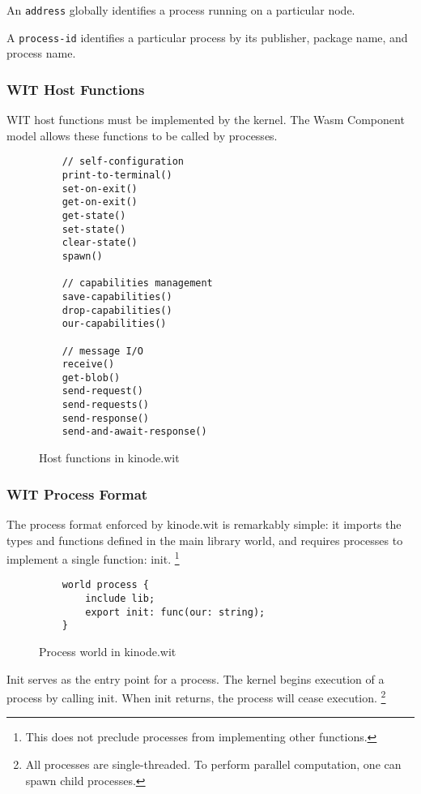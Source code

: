 \documentclass[runningheads]{llncs}
\begin{document}
An \verb|address| globally identifies a process running on a particular node.

A \verb|process-id| identifies a particular process by its publisher, package name, and process name.

\subsubsection{WIT Host Functions}

WIT host functions must be implemented by the kernel.
The Wasm Component model allows these functions to be called by processes.

\begin{figure}[H]
    \centering
    \begin{lstlisting}
    // self-configuration
    print-to-terminal()
    set-on-exit()
    get-on-exit()
    get-state()
    set-state()
    clear-state()
    spawn()

    // capabilities management
    save-capabilities()
    drop-capabilities()
    our-capabilities()

    // message I/O
    receive()
    get-blob()
    send-request()
    send-requests()
    send-response()
    send-and-await-response()
    \end{lstlisting}
    \caption{Host functions in kinode.wit}
    \label{fig:WIT Functions}
\end{figure}

\subsubsection{WIT Process Format}

The process format enforced by kinode.wit is remarkably simple: it imports the types and functions defined in the main library world, and requires processes to implement a single function: init.
\footnote{This does not preclude processes from implementing other functions.}

\begin{figure}[H]
    \centering
    \begin{lstlisting}
    world process {
        include lib;
        export init: func(our: string);
    }
    \end{lstlisting}
    \caption{Process world in kinode.wit}
    \label{fig:Process world}
\end{figure}

Init serves as the entry point for a process.
The kernel begins execution of a process by calling init.
When init returns, the process will cease execution.
\footnote{All processes are single-threaded. To perform parallel computation, one can spawn child processes.}
\end{document}
